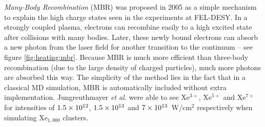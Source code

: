\textit{Many-Body Recombination} (MBR) was proposed in 2005\cite{Jungreuthmayer2005}
as a simple mechanism to explain the high charge states seen in the
experiments at FEL-DESY. In a strongly coupled plasma, electrons can recombine
easily to a high excited
state after collisions with many bodies. Later, these newly bound electrons can
absorb a new photon from the laser field for another transition to the
continuum -- see figure \ref{fig:heating:mbr}.
Because MBR is much more efficient than three-body
recombination (due to the large density of charged particles), much more
photons are absorbed this way. The simplicity of the
method lies in the fact that in a classical MD simulation, MBR is automatically
included without extra implementation. Jungreuthmayer \textit{et al.} were able
to see Xe$^{3+}$, Xe$^{5+}$ and Xe$^{7+}$ for intensities of $\ten{1.5}{12}$,
$\ten{1.5}{13}$ and $\ten{7}{13}$~W/cm$^2$ respectively when simulating
Xe$_{1,000}$ clusters.


